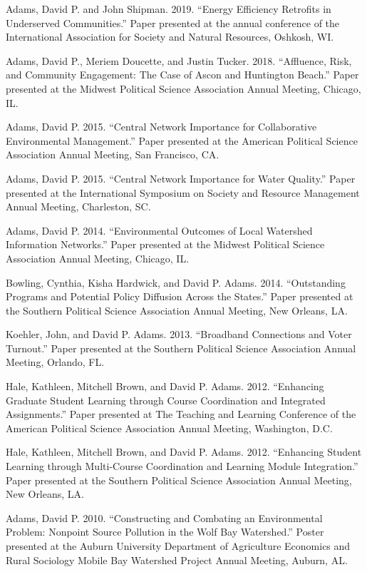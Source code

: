 \documentclass[11pt,letterpaper]{article}
\renewenvironment{itemize}{
  \begin{list}{}{
    \setlength{\leftmargin}{1.5em}
    \setlength{\itemsep}{0.25em}
    \setlength{\parskip}{0pt}
    \setlength{\parsep}{0.25em}
  }
}{
  \end{list}
}
\begin{document}
\begin{itemize}
    \item Adams, David P. and John Shipman. 2019. ``Energy Efficiency Retrofits in Underserved Communities.'' Paper presented at the annual conference of the International Association for Society and Natural Resources, Oshkosh, WI.
    
    \item Adams, David P., Meriem Doucette, and Justin Tucker. 2018. ``Affluence, Risk, and Community Engagement: The Case of Ascon and Huntington Beach.'' Paper presented at the Midwest Political Science Association Annual Meeting, Chicago, IL.
    
    \item Adams, David P. 2015. ``Central Network Importance for Collaborative Environmental Management.'' Paper presented at the American Political Science Association Annual Meeting, San Francisco, CA.
    
    \item Adams, David P. 2015. ``Central Network Importance for Water Quality.'' Paper presented at the International Symposium on Society and Resource Management Annual Meeting, Charleston, SC.
    
    \item Adams, David P. 2014. ``Environmental Outcomes of Local Watershed Information Networks.'' Paper presented at the Midwest Political Science Association Annual Meeting, Chicago, IL.
    
    \item Bowling, Cynthia, Kisha Hardwick, and David P. Adams. 2014. ``Outstanding Programs and Potential Policy Diffusion Across the States.'' Paper presented at the Southern Political Science Association Annual Meeting, New Orleans, LA.
    
    \item Koehler, John, and David P. Adams. 2013. ``Broadband Connections and Voter Turnout.'' Paper presented at the Southern Political Science Association Annual Meeting, Orlando, FL.
    
    \item Hale, Kathleen, Mitchell Brown, and David P. Adams. 2012. ``Enhancing Graduate Student Learning through Course Coordination and Integrated Assignments.'' Paper presented at The Teaching and Learning Conference of the American Political Science Association Annual Meeting, Washington, D.C.
    
    \item Hale, Kathleen, Mitchell Brown, and David P. Adams. 2012. ``Enhancing Student Learning through Multi-Course Coordination and Learning Module Integration.'' Paper presented at the Southern Political Science Association Annual Meeting, New Orleans, LA.
    
    \item Adams, David P. 2010. ``Constructing and Combating an Environmental Problem: Nonpoint Source Pollution in the Wolf Bay Watershed.'' Poster presented at the Auburn University Department of Agriculture Economics and Rural Sociology Mobile Bay Watershed Project Annual Meeting, Auburn, AL.
  \end{itemize}
  
\end{document}
